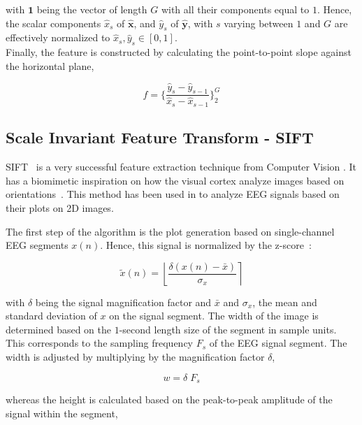 \documentclass[brainsci,article,submit,moreauthors,pdftex,10pt,a4paper]{mdpi}
\begin{document}
\noindent with $\textbf{1}$ being the vector of length $G$ with all their components equal to $1$.  Hence, the scalar components $\hat{x}_{s}$ of $\hat{\textbf{x}}$, and $\hat{y}_{s}$ of $\hat{\textbf{y}}$, with $s$ varying between $1$ and $G$ are effectively normalized to $\hat{x}_{s},\hat{y}_{s} \in [0,1]$. \\

Finally, the feature is constructed by calculating the point-to-point slope against the horizontal plane,

\begin{equation}
f = \bigg \{  \frac{\hat{y}_{s}-\hat{y}_{s-1}}{\hat{x}_{s}-\hat{x}_{s-1}}  \bigg \}_{2}^{G} 
\label{eq:shcc8}
\end{equation}


\subsection{Scale Invariant Feature Transform - SIFT}

SIFT~\citep{Lowe2004} is a very successful feature extraction technique from Computer Vision .  It has a biomimetic inspiration on how the visual cortex analyze images based on orientations~\citep{Edelman1997}.  This method has been used in \citep{Ramele2016} to analyze EEG signals based on their plots on 2D images.

The first step of the algorithm is the plot generation based on single-channel EEG segments $ x(n) $.  Hence, this signal is normalized by the z-score~\citep{Zhang2013}: 

\begin{equation}
\tilde{x}(n) = \left\lfloor \frac{\delta ( x(n) - \bar{x})}{\sigma_{x}} \right\rceil 
\label{eq:sift1}
\end{equation}

\noindent with $\delta$ being the signal magnification factor and $\bar{x}$ and $\sigma_{x}$, the mean and standard deviation of $x$ on the signal segment.  The width of the image is determined based on the $1$-second length size of the segment in sample units. This corresponds to the sampling frequency $F_s$ of the EEG signal segment. The width is adjusted by multiplying by the magnification factor $\delta$, 

\begin{equation}
w = \delta \; F_s
\label{eq:sift2}
\end{equation}

\noindent whereas the height is calculated based on the peak-to-peak amplitude of the signal within the segment,
\end{document}
